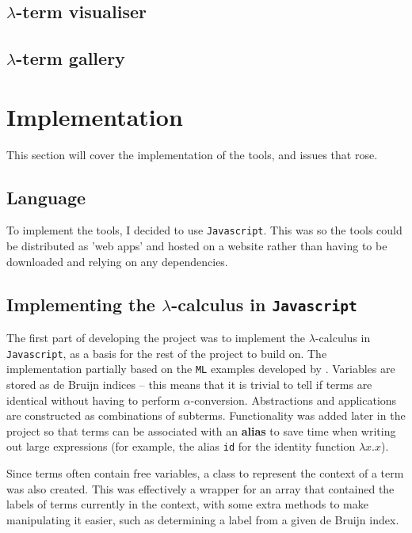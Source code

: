 \documentclass[12pt]{article}
\begin{document}
\subsection{\texorpdfstring{$\lambda$}{Lambda}-term visualiser}


\subsection{\texorpdfstring{$\lambda$}{Lambda}-term gallery}



\newpage

\section{Implementation}
\label{sec:implementation}

This section will cover the implementation of the tools, and issues that rose.

\subsection{Language}
To implement the tools, I decided to use \texttt{Javascript}. This was so the tools could be distributed as 'web apps' and hosted on a website rather than having to be downloaded and relying on any dependencies.

\subsection{Implementing the \texorpdfstring{$\lambda$}{lambda}-calculus in \texttt{Javascript}}
The first part of developing the project was to implement the $\lambda$-calculus in \texttt{Javascript}, as a basis for the rest of the project to build on. The implementation partially based on the \texttt{ML} examples developed by \cite{pierce}. Variables are stored as de Bruijn indices -- this means that it is trivial to tell if terms are identical without having to perform $\alpha$-conversion. Abstractions and applications are constructed as combinations of subterms. Functionality was added later in the project so that terms can be associated with an \textbf{alias} to save time when writing out large expressions (for example, the alias \texttt{id} for the identity function $\lambda x. x$).

Since terms often contain free variables, a class to represent the context of a term was also created. This was effectively a wrapper for an array that contained the labels of terms currently in the context, with some extra methods to make manipulating it easier, such as determining a label from a given de Bruijn index. 
\end{document}
